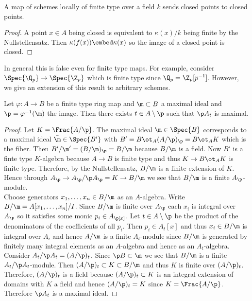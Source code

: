 \documentclass[12pt]{article}
\begin{document}
\begin{prop}
A map of schemes locally of finite type over a field $k$ sends closed points to closed points.
\end{prop}

\begin{proof}
A point $x \in A$ being closed is equivalent to $\kappa(x)/k$ being finite by the Nullstellensatz. Then $\kappa(f(x)) \embed \kappa(x)$ so the image of a closed point is closed. 
\end{proof}

\begin{rmk}
In general this is false even for finite type maps. For example, consider $\Spec{\Q_p} \to \Spec{\Z_p}$ which is finite type since $\Q_p = \Z_p[p^{-1}]$. However, we give an extension of this result to arbitrary schemes.
\end{rmk}

\begin{lemma}
Let $\varphi : A \to B$ be a finite type ring map and $\m \subset B$ a maximal ideal and $\p = \varphi^{-1}(\m)$ the image. Then there exists $t \in A \setminus \p$ such that $\p A_t$ is maximal. 
\end{lemma}

\begin{proof}
Let $K = \Frac{A/\p}$. The maximal ideal $\m \in \Spec{B}$ corresponds to a maximal ideal $\bar{\m} \in \Spec{B'}$ with $B' = B \ot_A (A / \p)_\p = B \ot_A K$ which is the fiber. Then $B' / \m' = (B / \m)_\p = B / \m$ because $B / \m$ is a field. Now $B'$ is a finte type $K$-algebra because $A \to B$ is finite type and thus $K \to B \ot_A K$ is finite type. Therefore, by the Nullstellensatz, $B / \m$ is a finite extension of $K$. Hence through $A_\p \to A_\p / \p A_\p = K \to B / \m$ we see that $B / \m$ is a finite $A_\p$-module.
\bigskip\\
Choose generators $x_1, \dots, x_n \in B / \m$ as an $A$-algebra. Write $B / \m = A[x_1, \dots, x_n]/I$. Since $B / \m$ is finite over $A_\p$ each $x_i$ is integral over $A_\p$ so it satisfies some monic $p_i \in A_\p[x]$. Let $t \in A \setminus \p$ be the product of the denominators of the coefficients of all $p_i$. Then $p_i \in A_t[x]$ and thus $x_i \in B / \m$ is integral over $A_i$ and hence $A / \m$ is a finite $A_t$-module since $B / \m$ is generated by finitely many integral elements as an $A$-algebra and hence as an $A_t$-algebra. 
\bigskip\\
Consider $A_t / \p A_t = (A / \p)_t$. Since $\p B \subset \m$ we see that $B / \m$ is a finite $A_t / \p A_t$-module. Then $(A / \p)_t \subset K \subset B / \m$ and thus $K$ is finite over $(A / \p)_t$. Therefore, $(A / \p)_t$ is a field because $(A/\p)_t \subset K$ is an integral extension of domains with $K$ a field and hence $(A / \p)_t = K$ since $K = \Frac{A/\p}$. Therefore $\p A_t$ is a maximal ideal.
\end{proof}
\end{document}
